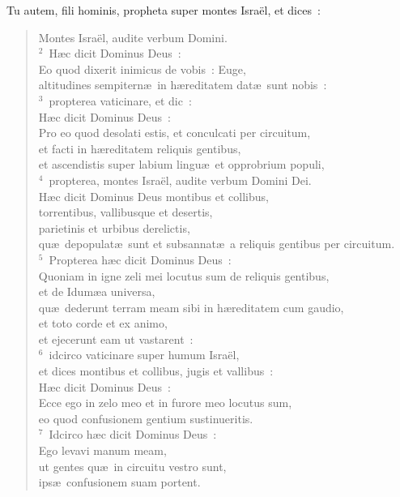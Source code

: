 \lettrine[lines=10,image=true,loversize=0.05,lraise=-0.03]{T}{}u autem, fili hominis, propheta super montes Isra\"el, et dices~: \begin{flushleft}\begin{verse}\vspace{6pt}Montes Isra\"el, audite verbum Domini.\\
${}^{2}$~H\ae c dicit Dominus Deus~:\\ Eo quod dixerit inimicus de vobis~: Euge,\\ altitudines sempitern\ae\ in h\ae reditatem dat\ae\ sunt nobis~:\\
${}^{3}$~propterea vaticinare, et dic~:\\ H\ae c dicit Dominus Deus~:\\ Pro eo quod desolati estis, et conculcati per circuitum,\\ et facti in h\ae reditatem reliquis gentibus,\\ et ascendistis super labium lingu\ae\ et opprobrium populi,\\
${}^{4}$~propterea, montes Isra\"el, audite verbum Domini Dei.\\ H\ae c dicit Dominus Deus montibus et collibus,\\ torrentibus, vallibusque et desertis,\\ parietinis et urbibus derelictis,\\ qu\ae\ depopulat\ae\ sunt et subsannat\ae\ a reliquis gentibus per circuitum.\\
${}^{5}$~Propterea h\ae c dicit Dominus Deus~:\\ Quoniam in igne zeli mei locutus sum de reliquis gentibus,\\ et de Idum\ae a universa,\\ qu\ae\ dederunt terram meam sibi in h\ae reditatem cum gaudio,\\ et toto corde et ex animo,\\ et ejecerunt eam ut vastarent~:\\
${}^{6}$~idcirco vaticinare super humum Isra\"el,\\ et dices montibus et collibus, jugis et vallibus~:\\ H\ae c dicit Dominus Deus~:\\ Ecce ego in zelo meo et in furore meo locutus sum,\\ eo quod confusionem gentium sustinueritis.\\
${}^{7}$~Idcirco h\ae c dicit Dominus Deus~:\\ Ego levavi manum meam,\\ ut gentes qu\ae\ in circuitu vestro sunt,\\ ips\ae\ confusionem suam portent.\\

\end{verse}
\end{flushleft}
